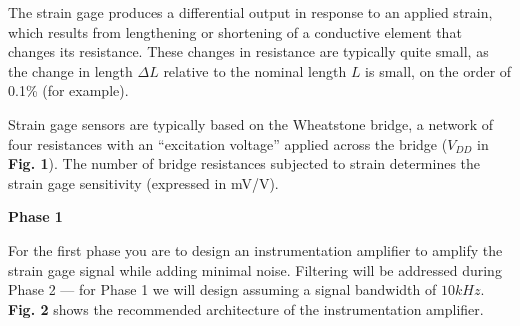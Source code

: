 \documentclass[11pt]{article}
\begin{document}
The strain gage produces a differential output in response to an applied strain, which results from lengthening or shortening of a conductive element that changes its resistance. These changes in resistance are typically quite small, as the change in length $\Delta L$ relative to the nominal length $L$ is small, on the order of 0.1\% (for example).

Strain gage sensors are typically based on the Wheatstone bridge, a network of four resistances with an ``excitation voltage'' applied across the bridge ($V_{DD}$ in \textbf{Fig. 1}). The number of bridge resistances subjected to strain determines the strain gage sensitivity (expressed in mV/V).

\vspace{1.5em}
\textbf{\Large Phase 1}

For the first phase you are to design an instrumentation amplifier to amplify the strain gage signal while adding minimal noise. Filtering will be addressed during Phase 2 — for Phase 1 we will design assuming a signal bandwidth of $10 kHz$. \textbf{Fig. 2} shows the recommended architecture of the instrumentation amplifier.
\end{document}
